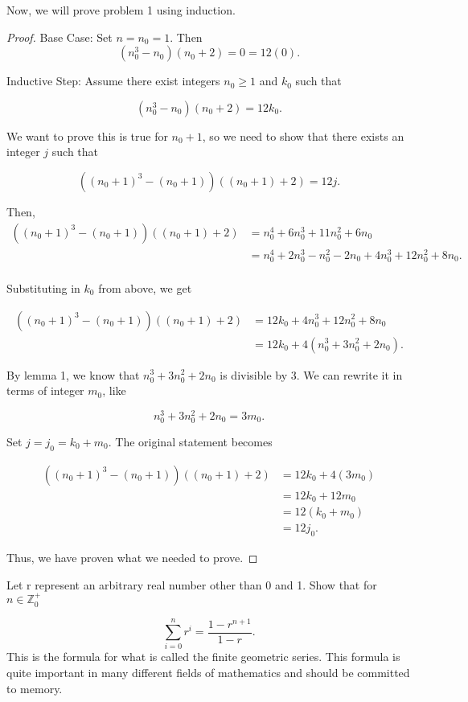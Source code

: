 \documentclass[12pt]{article}
\newenvironment{problem}[2][Problem]{\begin{trivlist}
\item[\hskip \labelsep {\bfseries #1}\hskip \labelsep {\bfseries #2.}]}{\end{trivlist}}
\begin{document}
\newpage \noindent Now, we will prove problem 1 using induction.

\begin{proof} Base Case: Set $n = n_0 = 1$. Then
    $$(n_0^3 - n_0)(n_0 + 2) = 0 = 12(0).$$

    \noindent Inductive Step: Assume there exist integers $n_0 \geq 1$ and $k_0$ such that

    $$(n_0^3 - n_0)(n_0 + 2) = 12k_0.$$

    We want to prove this is true for $n_0 + 1$, so we need to show that there exists an integer $j$ such that

    $$((n_0+1)^3 - (n_0+1))((n_0+1) + 2) = 12j.$$

    Then,
    \begin{align*}
        ((n_0+1)^3 - (n_0+1))((n_0+1) + 2) & = n_0^4 + 6n_0^3 + 11n_0^2 + 6n_0 \\
        & = n_0^4 + 2n_0^3 - n_0^2 - 2n_0 + 4n_0^3 + 12n_0^2+8n_0.\\
    \end{align*}

    Substituting in $k_0$ from above, we get

    \begin{align*}
        ((n_0+1)^3 - (n_0+1))((n_0+1) + 2) & = 12k_0 + 4n_0^3 + 12n_0^2 + 8n_0 \\
        & = 12k_0 + 4(n_0^3 + 3n_0^2 + 2n_0).
    \end{align*}

    By lemma 1, we know that $n_0^3 + 3n_0^2 + 2n_0$ is divisible by 3. We can rewrite it in terms of integer $m_0$, like

    $$n_0^3 + 3n_0^2 + 2n_0 = 3m_0.$$
    
    Set $j = j_0 = k_0 + m_0$. The original statement becomes

    \begin{align*}
        ((n_0+1)^3 - (n_0+1))((n_0+1) + 2) & = 12k_0 + 4(3m_0) \\
        & = 12k_0 + 12m_0 \\
        & = 12(k_0 + m_0) \\
        & = 12j_0.
    \end{align*}

    Thus, we have proven what we needed to prove.

\end{proof}





\newpage
\begin{problem}{2}
    Let r represent an arbitrary real number other than 0 and 1. Show that for $n \in \mathbb{Z}_0^+$

    $$\sum_{i=0}^{n} r^i = \frac{1 - r^{n+1}}{1 - r}.$$
    This is the formula for what is called the finite geometric series. This formula is quite important in many different fields of mathematics and should be committed to memory.

\end{problem}
\end{document}

